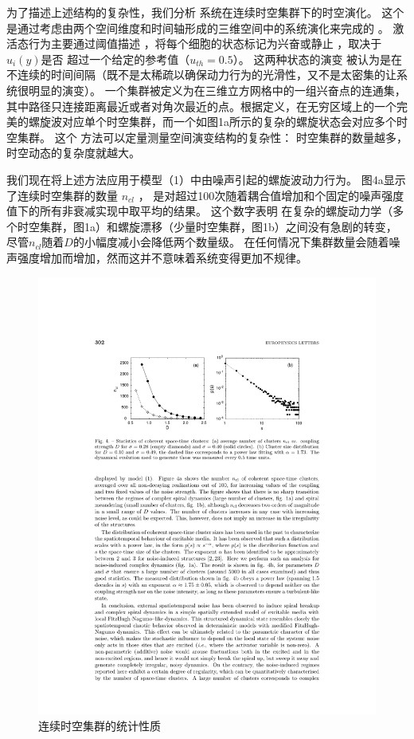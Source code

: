 \documentclass[
pdflinks,
]{xjtuthesis}
\begin{document}
\medskip
为了描述上述结构的复杂性，我们分析
系统在连续时空集群下的时空演化。 这个
是通过考虑由两个空间维度和时间轴形成的三维空间中的系统演化来完成的
。 激活态行为主要通过阈值描述
，将每个细胞的状态标记为兴奋或静⽌ ，取决于$u_i(y)$是否
超过一个给定的参考值（$u_{th}= 0.5$）。 这两种状态的演变
被认为是在不连续的时间间隔（既不是太稀疏以确保动力行为的光滑性，又不是太密集的让系统很明显的演变）。 ⼀个集群被定义为在三维⽴⽅⽹格中的⼀组兴奋点的连通集，其中路径只连接距离最近或者对角次最近的点。根据定义，在无穷区域上的一个完美的螺旋波对应单个时空集群，而一个如图1a所⽰的复杂的螺旋状态会对应多个时空集群。 这个
⽅法可以定量测量空间演变结构的复杂性：
时空集群的数量越多，时空动态的复杂度就越⼤。

\medskip
我们现在将上述⽅法应⽤于模型（1）中由噪声引起的螺旋波动力行为。 图4a显⽰了连续时空集群的数量 $n_{cl}$ ，
是对超过100次随着耦合值增加和个固定的噪声强度值下的所有⾮衰减实现中取平均的结果。 这个数字表明
在复杂的螺旋动⼒学（多个时空集群，图1a）和螺旋漂移（少量时空集群，图1b）之间没有急剧的转变，尽管$n_{cl}$随着$D$的小幅度减小会降低两个数量级。 在任何情况下集群数量会随着噪声强度增加而增加，然⽽这并不意味着系统变得更加不规律。

\begin{figure}[!ht]
\centering
\includegraphics[scale=1]{figures/fig4.pdf}
\caption{连续时空集群的统计性质}
\end{figure}
\end{document}
